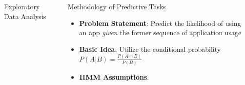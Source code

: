 \documentclass[final]{beamer}
\newlength{\sepwidth}
\newlength{\colwidth}
\newcommand{\separatorcolumn}{\begin{column}{\sepwidth}\end{column}}
\begin{document}
\begin{frame}[t]
\begin{columns}[t]
\begin{column}{\colwidth}
\begin{block}{\LARGE{Exploratory Data Analysis}}
  \begin{figure}
    \begin{mdframed}[backgroundcolor=gray!5,linecolor=gray!10]
    \end{mdframed}
  \end{figure}

  \end{block}

\end{column}

\separatorcolumn

\begin{column}{\colwidth}

\begin{exampleblock}{\LARGE{Methodology of Predictive Tasks}}

  \large{

   \begin{itemize}
       \item \textbf{Problem Statement}: Predict the likelihood of using an app \textit{given} the former sequence of application usage
       \item \textbf{Basic Idea}: Utilize the conditional probability $P(A|B) = \frac{P(A\cap B)}{P(B)}$
       \item \textbf{HMM Assumptions}:
           

\end{itemize}}
\end{exampleblock}
\end{column}
\end{columns}
\end{frame}
\end{document}
